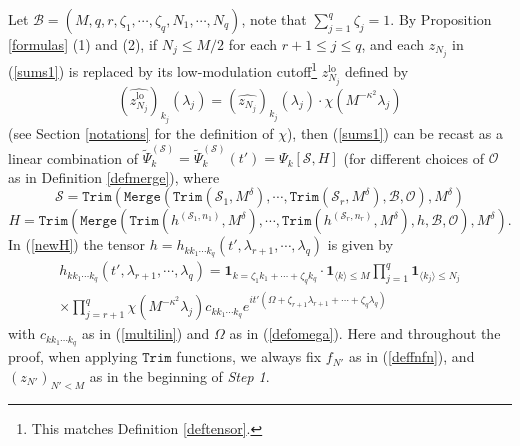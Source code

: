 \documentclass[11 pt,reqno]{amsart}
\theoremstyle{definition}
\theoremstyle{remark}
\numberwithin{equation}{section}
\newcommand{\Sc}{\mathcal{S}}
\newcommand{\Bs}{\mathscr{B}}
\newcommand{\Os}{\mathscr{O}}
\begin{document}
{Let $\Bs=(M,q,r,\zeta_1,\cdots,\zeta_q,N_1,\cdots,N_q)$, note that $\sum_{j=1}^q\zeta_j=1$. By Proposition \ref{formulas} (1) and (2), if $N_j\leq M/2$ for each $r+1\leq j\leq q$, and each $z_{N_j}$ in (\ref{sums1}) is replaced by its low-modulation cutoff\footnote{This matches Definition \ref{deftensor}.} $z_{N_j}^{\mathrm{lo}}$ defined by \[(\widehat{z_{N_j}^{\mathrm{lo}}})_{k_j}(\lambda_j)=(\widehat{z_{N_j}})_{k_j}(\lambda_j)\cdot\chi(M^{-\kappa^2}\lambda_j)\] (see Section \ref{notations} for the definition of $\chi$), then (\ref{sums1}) can be recast as a linear combination of $\widetilde{\Psi}_k^{(\Sc)}=\widetilde{\Psi}_k^{(\Sc)}(t')=\Psi_k[\Sc,H]$ (for different choices of $\Os$ as in Definition \ref{defmerge}), where
\begin{equation}\label{newpsi}\Sc=\mathtt{Trim}(\mathtt{Merge}(\mathtt{Trim}(\Sc_1,M^\delta),\cdots,\mathtt{Trim}(\Sc_r,M^\delta),\Bs,\Os),M^\delta)
\end{equation}
\begin{equation}\label{newH}H=\mathtt{Trim}(\mathtt{Merge}(\mathtt{Trim}(h^{(\Sc_1,n_1)},M^\delta),\cdots,\mathtt{Trim}(h^{(\Sc_r,n_r)},M^\delta),h,\Bs,\Os),M^\delta).
\end{equation} In (\ref{newH}) the tensor $h=h_{kk_1\cdots k_q}(t',\lambda_{r+1},\cdots,\lambda_q)$ is given by
\begin{multline}\label{basetensor}h_{kk_1\cdots k_q}(t',\lambda_{r+1},\cdots,\lambda_q)=\mathbf{1}_{k=\zeta_1k_1+\cdots +\zeta_qk_q}\cdot\mathbf{1}_{\langle k\rangle\leq M}\prod_{j=1}^q\mathbf{1}_{\langle k_j\rangle\leq  N_j}\\\times\prod _{j=r+1}^q\chi(M^{-\kappa^2}\lambda_j)c_{kk_1\cdots k_q}e^{it'(\Omega+\zeta_{r+1}\lambda_{r+1}+\cdots +\zeta_q\lambda_q)}
\end{multline}with $c_{kk_1\cdots k_q}$ as in (\ref{multilin}) and $\Omega$ as in (\ref{defomega}). Here and throughout the proof, when applying $\mathtt{Trim}$ functions, we always fix $f_{N'}$ as in (\ref{deffnfn}), and $(z_{N'})_{N'<M}$ as in the beginning of \emph{Step 1}.

}
\end{document}
